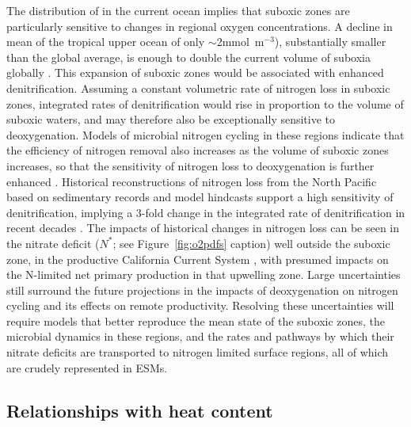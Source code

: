\documentclass[draft,linenumbers]{report_chapter}
\begin{document}
The distribution of  in the current ocean implies that suboxic zones are particularly sensitive to changes in regional oxygen concentrations.
A decline in mean  of the tropical upper ocean of only $\sim$2mmol~m$^{-3}$), substantially smaller than the global average,  is enough to double the current volume of suboxia globally \citep{Deutsch-Berelson-etal-2014}.
This expansion of suboxic zones would be associated with enhanced denitrification.
Assuming a constant volumetric rate of nitrogen loss in suboxic zones, integrated rates of denitrification would rise in proportion to the volume of suboxic waters, and may therefore also be exceptionally sensitive to deoxygenation.
Models of microbial nitrogen cycling in these regions indicate that the efficiency of nitrogen removal also increases as the volume of suboxic zones increases, so that the sensitivity of nitrogen loss to deoxygenation is further enhanced \citep{Penn-Weber-etal-2016}.
Historical reconstructions of nitrogen loss from the North Pacific based on sedimentary records and model hindcasts support a high sensitivity of denitrification, implying a 3-fold change in the integrated rate of denitrification in recent decades \citep{Deutsch-Berelson-etal-2014,Yang-Gruber-etal-2016}.
The impacts of historical changes in nitrogen loss can be seen in the nitrate deficit ($N^*$; see Figure~\ref{fig:o2pdfs} caption) well outside the suboxic zone, in the productive California Current System \citep{Deutsch-Brix-etal-2011}, with presumed impacts on the N-limited net primary production in that upwelling zone.
Large uncertainties still surround the future projections in the impacts of deoxygenation on nitrogen cycling and its effects on remote productivity.
Resolving these uncertainties will require models that better reproduce the mean state of the suboxic zones, the microbial dynamics in these regions, and the rates and pathways by which their nitrate deficits are transported to nitrogen limited surface regions, all of which are crudely represented in ESMs.

\subsection{Relationships with heat content}
\end{document}
